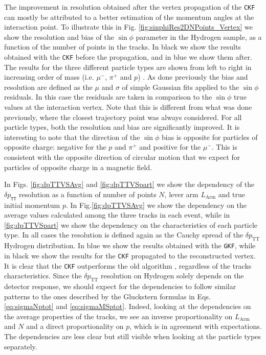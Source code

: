 The improvement in resolution obtained after the vertex propagation of the \texttt{CKF} can mostly be attributed to a better estimation of the momentum angles at the interaction point. To illustrate this in Fig. \ref{fig:sinphiRes2DNPoints_Vertex} we show the resolution and bias of the $\sin\phi$ parameter in the Hydrogen sample, as a function of the number of points in the tracks. In black we show the results obtained with the \texttt{CKF} before the propagation, and in blue we show them after. The results for the three different particle types are shown from left to right in increasing order of mass (i.e. $\mu^-$, $\pi^+$ and $p$) .  As done previously the bias and resolution are defined as the $\mu$ and $\sigma$ of simple Gaussian fits applied to the $\sin\phi$ residuals. In this case the residuals are taken in comparison to the $\sin\phi$ true values at the interaction vertex. Note that this is different from what was done previously, where the closest trajectory point was always considered. For all particle types, both the resolution and bias are significantly improved. It is interesting to note that the direction of the $\sin\phi$ bias is opposite for particles of opposite charge: negative for the $p$ and $\pi^+$ and positive for the $\mu^-$. This is consistent with the opposite direction of circular motion that we expect for particles of opposite charge in a magnetic field.

In Figs. \ref{fig:dpTTVSAvg} and \ref{fig:dpTTVSpart} we show the dependency of the $\delta p_\texttt{TT}$ resolution as a function of number of points $N$, lever arm $L_\text{Arm}$ and true initial momentum $p$. In Fig.\ref{fig:dpTTVSAvg} we show the dependency on the average values calculated among the three tracks in each event, while in \ref{fig:dpTTVSpart} we show the dependency on the characteristics of each particle type. In all cases the resolution is defined again as the Cauchy spread of the $\delta p_\text{TT}$ Hydrogen distribution. In blue we show the results obtained with the \texttt{\texttt{GKF}}, while in black we show the results for the \texttt{\texttt{CKF}} propagated to the reconstructed vertex. It is clear that the \texttt{\texttt{CKF}} outperforms the old algorithm , regardless of the tracks characteristics. Since the $\delta p_\text{TT}$ resolution on Hydrogen solely depends on the detector response, we should expect for the dependencies to follow similar patterns to the ones described by the Gluckstern formulas in Eqs. \ref{eq:sigmaNptot} and \ref{eq:sigmaMSptot}. Indeed, looking at the dependencies on the average properties of the tracks, we see an inverse proportionality on $L_\text{Arm}$ and $N$ and a direct proportionality on $p$, which is in agreement with expectations. The dependencies are less clear but still visible when looking at the particle types separately.


